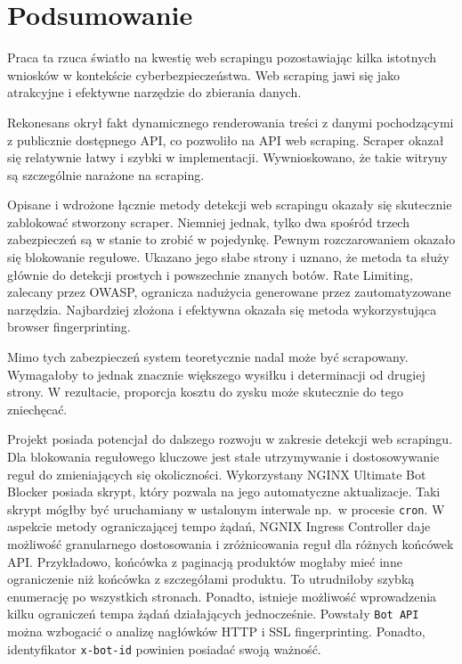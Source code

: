 \newpage


\section{Podsumowanie}\label{sec:podsumowanie}

Praca ta rzuca światło na kwestię web scrapingu pozostawiając kilka istotnych wniosków w kontekście cyberbezpieczeństwa.
Web scraping jawi się jako atrakcyjne i efektywne narzędzie do zbierania danych.

Rekonesans okrył fakt dynamicznego renderowania treści z danymi pochodzącymi z publicznie dostępnego API\@, co pozwoliło na API web scraping.
Scraper okazał się relatywnie łatwy i szybki w implementacji.
Wywnioskowano, że takie witryny są szczególnie narażone na scraping.

Opisane i wdrożone łącznie metody detekcji web scrapingu okazały się skutecznie zablokować stworzony scraper.
Niemniej jednak, tylko dwa spośród trzech zabezpieczeń są w stanie to zrobić w pojedynkę.
Pewnym rozczarowaniem okazało się blokowanie regułowe.
Ukazano jego słabe strony i uznano, że metoda ta służy głównie do detekcji prostych i powszechnie znanych botów.
Rate Limiting, zalecany przez OWASP, ogranicza nadużycia generowane przez zautomatyzowane narzędzia.
Najbardziej złożona i efektywna okazała się metoda wykorzystująca browser fingerprinting.

Mimo tych zabezpieczeń system teoretycznie nadal może być scrapowany.
Wymagałoby to jednak znacznie większego wysiłku i determinacji od drugiej strony.
W rezultacie, proporcja kosztu do zysku może skutecznie do tego zniechęcać.

Projekt posiada potencjał do dalszego rozwoju w zakresie detekcji web scrapingu.
Dla blokowania regułowego kluczowe jest stałe utrzymywanie i dostosowywanie reguł do zmieniających się okoliczności.
Wykorzystany NGINX Ultimate Bot Blocker posiada skrypt, który pozwala na jego automatyczne aktualizacje.
Taki skrypt mógłby być uruchamiany w ustalonym interwale np.~w procesie \texttt{cron}.
W aspekcie metody ograniczającej tempo żądań, NGNIX Ingress Controller daje możliwość granularnego dostosowania i zróżnicowania reguł dla różnych końcówek API\@.
Przykładowo, końcówka z paginacją produktów mogłaby mieć inne ograniczenie niż końcówka z szczegółami produktu.
To utrudniłoby szybką enumerację po wszystkich stronach.
Ponadto, istnieje możliwość wprowadzenia kilku ograniczeń tempa żądań działających jednocześnie.
Powstały \texttt{Bot API} można wzbogacić o analizę nagłówków HTTP i SSL fingerprinting.
Ponadto, identyfikator \texttt{x-bot-id} powinien posiadać swoją ważność.